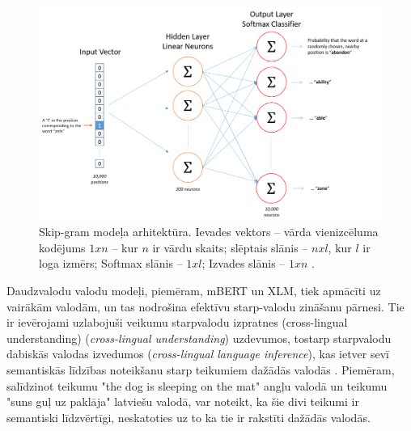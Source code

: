 \begin{figure}[h]
	\centering
	\includegraphics[width=\textwidth]{figures/skip_gram_net_arch.png}
	\caption{Skip-gram modeļa arhitektūra.
	Ievades vektors -- vārda vienizcēluma kodējums $1xn$ -- kur $n$ ir vārdu skaits; 
	slēptais slānis --  $nxl$, kur $l$ ir loga izmērs;
	Softmax slānis -- $1xl$;
	Izvades slānis -- $1xn$ \cite{mccormick2016}.}
	\label{fig:skipgram}
\end{figure}







Daudzvalodu valodu modeļi, piemēram, mBERT un XLM, tiek apmācīti uz vairākām valodām, un tas nodrošina efektīvu starp-valodu zināšanu pārnesi. Tie ir ievērojami uzlabojuši veikumu starpvalodu izpratnes (cross-lingual understanding) (\textit{cross-lingual understanding}) uzdevumos, tostarp starpvalodu dabiskās valodas izvedumos (\textit{cross-lingual language inference}), kas ietver sevī semantiskās līdzības noteikšanu starp teikumiem dažādās valodās \cite{conneau2020}. Piemēram, salīdzinot teikumu "the dog is sleeping on the mat" angļu valodā un teikumu "suns guļ uz paklāja" latviešu valodā, var noteikt, ka šie divi teikumi ir semantiski līdzvērtīgi, neskatoties uz to ka tie ir rakstīti dažādās valodās.